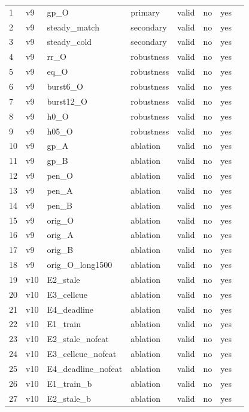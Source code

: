 \documentclass[10pt]{article}
\begin{document}
\begin{landscape}
\begin{longtable}{@{}llllllll@{}}
\midrule
\endhead
1 & v9 & gp\_O & primary & valid & no & yes &  \\
2 & v9 & steady\_match & secondary & valid & no & yes &  \\
3 & v9 & steady\_cold & secondary & valid & no & yes &  \\
4 & v9 & rr\_O & robustness & valid & no & yes &  \\
5 & v9 & eq\_O & robustness & valid & no & yes &  \\
6 & v9 & burst6\_O & robustness & valid & no & yes &  \\
7 & v9 & burst12\_O & robustness & valid & no & yes &  \\
8 & v9 & h0\_O & robustness & valid & no & yes &  \\
9 & v9 & h05\_O & robustness & valid & no & yes &  \\
10 & v9 & gp\_A & ablation & valid & no & yes &  \\
11 & v9 & gp\_B & ablation & valid & no & yes &  \\
12 & v9 & pen\_O & ablation & valid & no & yes &  \\
13 & v9 & pen\_A & ablation & valid & no & yes &  \\
14 & v9 & pen\_B & ablation & valid & no & yes &  \\
15 & v9 & orig\_O & ablation & valid & no & yes &  \\
16 & v9 & orig\_A & ablation & valid & no & yes &  \\
17 & v9 & orig\_B & ablation & valid & no & yes &  \\
18 & v9 & orig\_O\_long1500 & ablation & valid & no & yes &  \\
19 & v10 & E2\_stale & ablation & valid & no & yes &  \\
20 & v10 & E3\_cellcue & ablation & valid & no & yes &  \\
21 & v10 & E4\_deadline & ablation & valid & no & yes &  \\
22 & v10 & E1\_train & ablation & valid & no & yes &  \\
23 & v10 & E2\_stale\_nofeat & ablation & valid & no & yes &  \\
24 & v10 & E3\_cellcue\_nofeat & ablation & valid & no & yes &  \\
25 & v10 & E4\_deadline\_nofeat & ablation & valid & no & yes &  \\
26 & v10 & E1\_train\_b & ablation & valid & no & yes &  \\
27 & v10 & E2\_stale\_b & ablation & valid & no & yes &  \\

\end{longtable}
\end{landscape}
\end{document}
